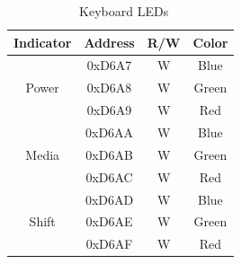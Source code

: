 \begin{table}
    \begin{center}
        \begin{tabular}{|c|c|c|c|} \hline
            Indicator & Address & R/W & Color \\\hline\hline
            \multirow{3}{*}{Power} & 0xD6A7 & W & Blue \\\cline{2-4}
                                   & 0xD6A8 & W & Green \\\cline{2-4}
                                   & 0xD6A9 & W & Red \\\hline

            \multirow{3}{*}{Media} & 0xD6AA & W & Blue \\\cline{2-4}
                                   & 0xD6AB & W & Green \\\cline{2-4}
                                   & 0xD6AC & W & Red \\\hline

            \multirow{3}{*}{Shift} & 0xD6AD & W & Blue \\\cline{2-4}
                                   & 0xD6AE & W & Green \\\cline{2-4}
                                   & 0xD6AF & W & Red \\\hline
        \end{tabular}
    \end{center}
    \caption{\fk\ Keyboard LEDs}
    \label{tab:f256k_kbd_leds}
\end{table}
